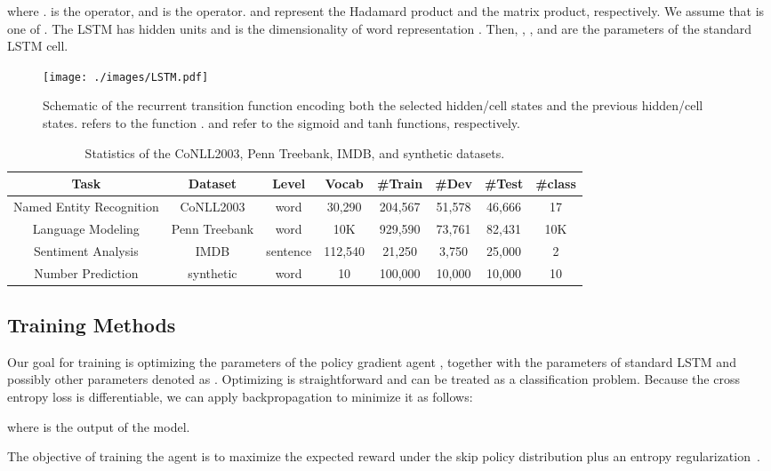 \documentclass[letterpaper]{article} \usepackage{aaai19}  \usepackage{times}  \usepackage{helvet}  \usepackage{courier}  \usepackage{url}  \usepackage{graphicx}  \usepackage{amsmath}
\begin{document}
where .  is the  operator, and  is the  operator.  and  represent the Hadamard product and the matrix product, respectively. We assume that  is one of . The LSTM has  hidden units and  is the dimensionality of word representation . Then, , , and  are the parameters of the standard LSTM cell.



\begin{figure}[t]
\centering
  \texttt{[image: ./images/LSTM.pdf]}
  \caption{Schematic of the recurrent transition function encoding both the selected hidden/cell states and the previous hidden/cell states.  refers to the function .  and  refer to the sigmoid and tanh functions, respectively.} \label{fig:LSTM}
\end{figure}

\begin{table*}[t]
\centering
\begin{tabular}{cccccccc}
\hline
  Task & Dataset & Level & Vocab  & \textbf{\#}Train & \textbf{\#}Dev & \textbf{\#}Test & \textbf{\#}class \\
  \hline
  Named Entity Recognition & CoNLL2003 & word & 30,290 & 204,567 & 51,578 & 46,666 & 17 \\
  Language Modeling & Penn Treebank & word & 10K & 929,590 & 73,761 & 82,431 & 10K \\
  Sentiment Analysis & IMDB & sentence & 112,540 & 21,250 & 3,750 & 25,000 & 2 \\
  Number Prediction & synthetic & word & 10 & 100,000 & 10,000 & 10,000 & 10 \\
  \hline 
\end{tabular}
\caption{Statistics of the CoNLL2003, Penn Treebank, IMDB, and synthetic datasets.}
  \label{tab:statistics}
\end{table*}

\subsection{Training Methods}
Our goal for training is optimizing the parameters of the policy gradient agent , together with the parameters of standard LSTM and possibly other parameters denoted as . Optimizing  is straightforward and can be treated as a classification problem. Because the cross entropy loss  is differentiable, we can apply backpropagation to minimize it as follows:

where  is the output of the model.

The objective of training the agent is to maximize the expected reward under the skip policy distribution plus an entropy regularization~\cite{nachum2017bridging}.
\end{document}
